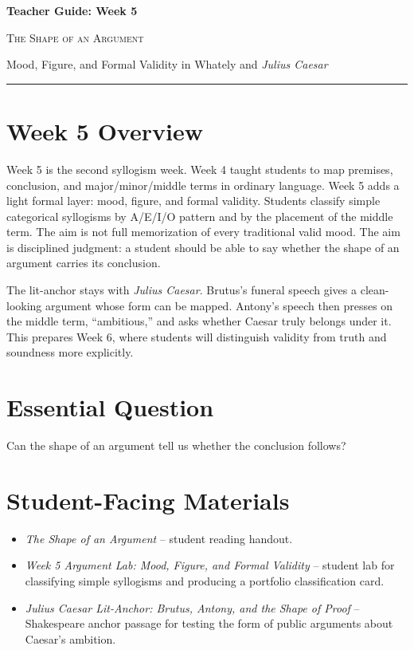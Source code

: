 \documentclass[12pt]{article}
\begin{document}
\begin{center}
{\LARGE\bfseries Teacher Guide: Week 5}\par\vspace{0.25em}
{\large\scshape The Shape of an Argument}\par\vspace{0.4em}
{Mood, Figure, and Formal Validity in Whately and \textit{Julius Caesar}}\par\vspace{0.6em}
\rule{0.82\textwidth}{0.4pt}
\end{center}

\section*{Week 5 Overview}
Week 5 is the second syllogism week. Week 4 taught students to map premises, conclusion, and major/minor/middle terms in ordinary language. Week 5 adds a light formal layer: mood, figure, and formal validity. Students classify simple categorical syllogisms by A/E/I/O pattern and by the placement of the middle term. The aim is not full memorization of every traditional valid mood. The aim is disciplined judgment: a student should be able to say whether the shape of an argument carries its conclusion.

The lit-anchor stays with \textit{Julius Caesar}. Brutus's funeral speech gives a clean-looking argument whose form can be mapped. Antony's speech then presses on the middle term, ``ambitious,'' and asks whether Caesar truly belongs under it. This prepares Week 6, where students will distinguish validity from truth and soundness more explicitly.

\section*{Essential Question}
Can the shape of an argument tell us whether the conclusion follows?

\section*{Student-Facing Materials}
\begin{itemize}[leftmargin=*]
\item \textit{The Shape of an Argument} -- student reading handout.
\item \textit{Week 5 Argument Lab: Mood, Figure, and Formal Validity} -- student lab for classifying simple syllogisms and producing a portfolio classification card.
\item \textit{Julius Caesar Lit-Anchor: Brutus, Antony, and the Shape of Proof} -- Shakespeare anchor passage for testing the form of public arguments about Caesar's ambition.
\end{itemize}
\end{document}
